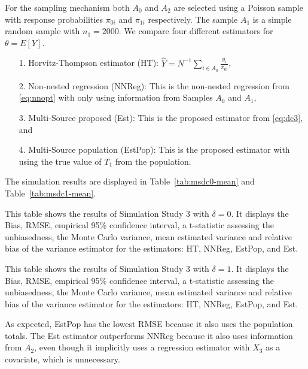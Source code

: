 \documentclass[12pt]{article}
\begin{document}
For the sampling mechanism both $A_0$ and $A_2$ are selected using a Poisson
sample with response probabilities $\pi_{0i}$ and $\pi_{1i}$ respectively. The
sample $A_1$ is a simple random sample with $n_1 = 2000$. We compare four
different estimators for $\theta = E[Y]$.
\begin{itemize}
  \item[1.] Horvitz-Thompson estimator (HT): $\hat Y = N^{-1} \sum_{i \in A_0}
    \frac{y_i}{\pi_{0i}}$,
  \item[2.] Non-nested regression (NNReg): This is the non-nested regression from
    \eqref{eq:nnopt} with only using information from Samples $A_0$ and
    $A_1$,
  \item[3.] Multi-Source proposed (Est): This is the proposed estimator from
    \eqref{eq:dc3}, and
  \item[4.] Multi-Source population (EstPop): This is the proposed estimator with
    using the true value of $T_1$ from the population.
\end{itemize}
The simulation results are displayed in Table~\ref{tab:msdc0-mean} and
Table~\ref{tab:msdc1-mean}.

\begin{table}[ht!]
  \centering
  
\caption{This table shows the results of Simulation Study 3 with $\delta = 0$.
  It displays the Bias, RMSE, empirical 95\% confidence interval, a t-statistic
  assessing the unbiasedness, the Monte Carlo variance, mean estimated variance
  and relative bias of the variance estimator for the estimators: HT, NNReg,
  EstPop, and Est.}
\label{tab:msdc0-mean}
\end{table}

\begin{table}[ht!]
  \centering
  
\caption{This table shows the results of Simulation Study 3 with $\delta = 1$.
  It displays the Bias, RMSE, empirical 95\% confidence interval, a t-statistic
  assessing the unbiasedness, the Monte Carlo variance, mean estimated variance
  and relative bias of the variance estimator for the estimators: HT, NNReg,
  EstPop, and Est.}
\label{tab:msdc1-mean}
\end{table}

As expected, EstPop has the lowest RMSE because it also uses the population
totals. The Est estimator outperforms
NNReg because it also uses information from $A_2$, even though it implicitly
uses a regression estimator with $X_3$ as a covariate, which is unnecessary.
\end{document}
